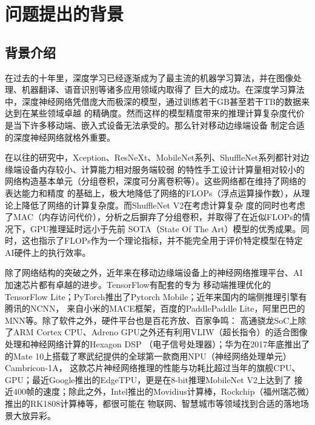 \section{问题提出的背景}

\subsection{背景介绍}

在过去的十年里，深度学习已经逐渐成为了最主流的机器学习算法，并在图像处理、机器翻译、语音识别等诸多应用领域内取得了
巨大的成功。在深度学习算法中，深度神经网络凭借庞大而极深的模型，通过训练若干GB甚至若干TB的数据来达到在某些领域卓越
的精确度。然而这样的模型精度带来的推理计算复杂度代价是当下许多移动端、嵌入式设备无法承受的。那么针对移动边缘端设备
制定合适的深度神经网络就格外重要。

在以往的研究中，Xception、ResNeXt、MobileNet系列、ShuffleNet系列都针对边缘端设备内存较小、计算能力相对服务端较弱
的特性手工设计计算量相对较小的网络构造基本单元（分组卷积，深度可分离卷积等）。这些网络都在维持了网络的表达能力和精度
的基础上，极大地降低了网络的FLOPs（浮点运算操作数），从理论上降低了网络的计算复杂度。而ShuffleNet V2在考虑计算复杂
度的同时也考虑了MAC（内存访问代价），分析之后摒弃了分组卷积，并取得了在近似FLOPs的情况下，GPU推理延时远小于先前
SOTA（State Of The Art）模型的优秀成果。同时，这也指示了FLOPs作为一个理论指标，并不能完全用于评价特定模型在特定
AI硬件上的执行效率。

除了网络结构的突破之外，近年来在移动边缘端设备上的神经网络推理平台、AI加速芯片都有卓越的进步。TensorFlow有配套的专为
移动端推理优化的TensorFlow Lite；PyTorch推出了Pytorch Mobile；近年来国内的端侧推理引擎有腾讯的NCNN，
来自小米的MACE框架，百度的PaddlePaddle Lite，阿里巴巴的MNN等。除了软件之外，硬件平台也是百花齐放、百家争鸣：
高通骁龙SoC上除了ARM Cortex CPU、Adreno GPU之外还有利用VLIW（超长指令）的适合图像处理和神经网络计算的Hexagon DSP
（电子信号处理器）；华为在2017年底推出了的Mate 10上搭载了寒武纪提供的全球第一款商用NPU（神经网络处理单元）Cambricon-1A，
这款芯片神经网络推理的性能与功耗比超过当年的旗舰CPU、GPU；最近Google推出的EdgeTPU，更是在8-bit推理MobileNet V2上达到了
接近400帧的速度；除此之外，Intel推出的Movidius计算棒，Rockchip（福州瑞芯微）推出的RK1808计算棒等，都很可能在
物联网、智慧城市等领域找到合适的落地场景大放异彩。


